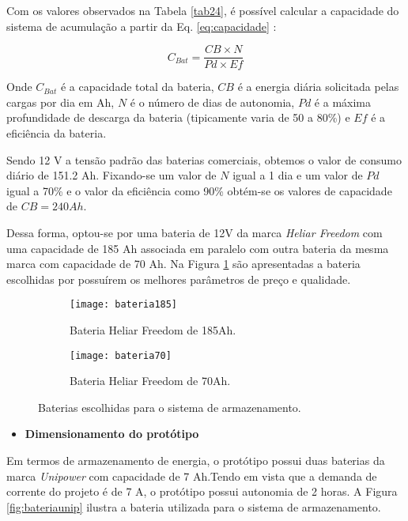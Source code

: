 Com os valores observados na Tabela \ref{tab24}, é possível calcular a capacidade do sistema de acumulação a partir da Eq. \ref{eq:capacidade} \cite{alan}:

\begin{equation}
    C_{Bat} = \frac{CB \times N}{Pd \times Ef}
    \label{eq:capacidade}
\end{equation}




Onde $C_{Bat}$ é a capacidade total da bateria, $CB$ é a energia diária solicitada pelas cargas por dia em Ah, $N$ é o número de dias de autonomia, $Pd$ é a máxima profundidade de descarga da bateria (tipicamente varia de 50 a 80\%) e $Ef$ é a eficiência da bateria.

Sendo 12 V a tensão padrão das baterias comerciais, obtemos o valor de consumo diário de 151.2 Ah. Fixando-se um valor de $N$ igual a 1 dia e um valor de $Pd$ igual a 70\% e o valor da eficiência como 90\% obtém-se os valores de capacidade de $CB = 240 Ah$. 


Dessa forma, optou-se por uma bateria de 12V da marca \textit{Heliar Freedom} com uma capacidade de 185 Ah associada em paralelo com outra bateria da mesma marca com capacidade de 70 Ah. Na Figura \ref{fig:bateria} são apresentadas a bateria escolhidas por possuírem os melhores parâmetros de preço e qualidade.


\begin{figure}[H]

    \centering
      \begin{subfigure}{0.45\textwidth}
        \texttt{[image: bateria185]}
        \caption{Bateria Heliar Freedom de 185Ah.}
      \end{subfigure}
      \hfill
      \begin{subfigure}{0.35\textwidth}
        \texttt{[image: bateria70]}
        \caption{Bateria Heliar Freedom de 70Ah.}
      \end{subfigure}
    \caption{Baterias escolhidas para o sistema de armazenamento.}
    \label{fig:bateria}
\end{figure}


    \begin{itemize}
        \item \textbf{Dimensionamento do protótipo}
    \end{itemize}
    
    Em termos de armazenamento de energia, o protótipo possui duas baterias da marca \textit{Unipower} com capacidade de 7 Ah.Tendo em vista que a demanda de corrente do projeto é de 7 A, o protótipo possui autonomia de 2 horas. A Figura \ref{fig:bateriaunip} ilustra a bateria utilizada para o sistema de armazenamento.
    

